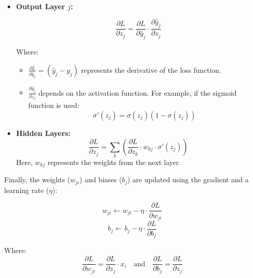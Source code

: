 \begin{itemize}
    \item \textbf{Output Layer $j$:}

    \[
    \frac{\partial L}{\partial z_j} = \frac{\partial L}{\partial \hat{y}_j} \cdot \frac{\partial \hat{y}_j}{\partial z_j}
    \]

    Where:
    \begin{itemize}
        \item $\frac{\partial L}{\partial \hat{y}_j} = (\hat{y}_j - y_j)$ represents the derivative of the loss function.
        \item $\frac{\partial \hat{y}_j}{\partial z_j}$ depends on the activation function. For example, if the sigmoid function is used:
        \[
        \sigma'(z_j) = \sigma(z_j)(1 - \sigma(z_j))
        \]
    \end{itemize}

    \item \textbf{Hidden Layers:}
    \[
    \frac{\partial L}{\partial z_j} = \sum_{k} \left( \frac{\partial L}{\partial z_k} \cdot w_{kj} \cdot \sigma'(z_j) \right)
    \]
    Here, $w_{kj}$ represents the weights from the next layer.
\end{itemize}

Finally, the weights ($w_{ji}$) and biases ($b_j$) are updated using the gradient and a learning rate ($\eta$):

\[
w_{ji} \leftarrow w_{ji} - \eta \cdot \frac{\partial L}{\partial w_{ji}}
\]
\[
b_j \leftarrow b_j - \eta \cdot \frac{\partial L}{\partial b_j}
\]

Where:
\[
\frac{\partial L}{\partial w_{ji}} = \frac{\partial L}{\partial z_j} \cdot x_i 
\quad \text{and} \quad 
\frac{\partial L}{\partial b_j} = \frac{\partial L}{\partial z_j}
\]
